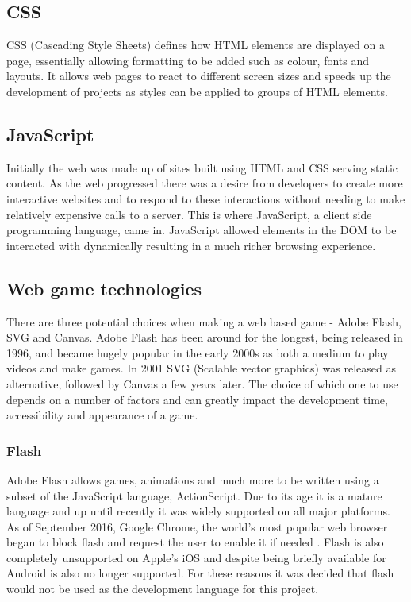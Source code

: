 \documentclass[12pt,a4paper]{report}
\begin{document}
\subsection{CSS}
CSS (Cascading Style Sheets) defines how HTML elements are displayed on a page, essentially allowing formatting to be added such as colour, fonts and layouts. It allows web pages to react to different screen sizes and speeds up the development of projects as styles can be applied to groups of HTML elements. 

\subsection{JavaScript}
Initially the web was made up of sites built using HTML and CSS serving static content. As the web progressed there was a desire from developers to create more interactive websites and to respond to these interactions without needing to make relatively expensive calls to a server. This is where JavaScript, a client side programming language, came in. JavaScript allowed elements in the DOM to be interacted with dynamically resulting in a much richer browsing experience.

\subsection{Web game technologies}
There are three potential choices when making a web based game - Adobe Flash, SVG and Canvas. Adobe Flash has been around for the longest, being released in 1996, and became hugely popular in the early 2000s as both a medium to play videos and make games. In 2001 SVG (Scalable vector graphics) was released as alternative, followed by Canvas a few years later. The choice of which one to use depends on a number of factors and can greatly impact the development time, accessibility and appearance of a game. 

\subsubsection{Flash}
Adobe Flash allows games, animations and much more to be written using a subset of the JavaScript language, ActionScript. Due to its age it is a mature language and up until recently it was widely supported on all major platforms. As of September 2016, Google Chrome, the world's most popular web browser began to block flash and request the user to enable it if needed \citep{FlashInChrome}. Flash is also completely unsupported on Apple's iOS and despite being briefly available for Android is also no longer supported. For these reasons it was decided that flash would not be used as the development language for this project.
\end{document}
